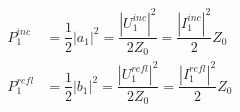 \begin{equation}
\begin{aligned}
	P_1^{inc} &= \dfrac{1}{2}|a_1|^2= \dfrac{|U_1^{inc}|^2}{2Z_0}=\dfrac{|I_1^{inc}|^2}{2}Z_0 \\
	P_1^{refl} &= \dfrac{1}{2}|b_1|^2= \dfrac{|U_1^{refl}|^2}{2Z_0}=\dfrac{|I_1^{refl}|^2}{2}Z_0 \\
\end{aligned}
\end{equation}

